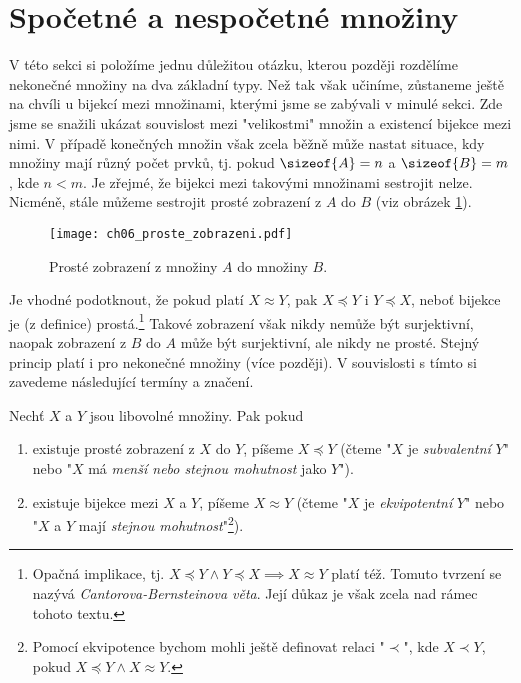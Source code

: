 \section{Spočetné a nespočetné množiny}\label{sec:spocetne_a_nespocetne_mnoziny}
V této sekci si položíme jednu důležitou otázku, kterou později rozdělíme nekonečné množiny na dva základní typy. Než tak však učiníme, zůstaneme ještě na chvíli u bijekcí mezi množinami, kterými jsme se zabývali v minulé sekci. Zde jsme se snažili ukázat souvislost mezi "velikostmi" množin a existencí bijekce mezi nimi. V případě konečných množin však zcela běžně může nastat situace, kdy množiny mají různý počet prvků, tj. pokud $\sizeof{A}=n$ a $\sizeof{B}=m$, kde $n<m$. Je zřejmé, že bijekci mezi takovými množinami sestrojit nelze. Nicméně, stále můžeme sestrojit prosté zobrazení z $A$ do $B$ (viz obrázek \ref{fig:proste_zobrazeni_A_do_B}).
\begin{figure}[H]
    \centering
    \texttt{[image: ch06\_proste\_zobrazeni.pdf]}
    \caption{Prosté zobrazení z množiny $A$ do množiny $B$.}
    \label{fig:proste_zobrazeni_A_do_B}
\end{figure}
Je vhodné podotknout, že pokud platí $X\approx Y$, pak $X\preccurlyeq Y$ i $Y\preccurlyeq X$, neboť bijekce je (z definice) prostá.\footnote{Opačná implikace, tj. $X\preccurlyeq Y \land Y\preccurlyeq X\implies X\approx Y$ platí též. Tomuto tvrzení se nazývá \emph{Cantorova-Bernsteinova věta}. Její důkaz je však zcela nad rámec tohoto textu.}
Takové zobrazení však nikdy nemůže být surjektivní, naopak zobrazení z $B$ do $A$ může být surjektivní, ale nikdy ne prosté. Stejný princip platí i pro nekonečné množiny (více později). V souvislosti s tímto si zavedeme následující termíny a značení.
\begin{definition}\label{def:subvalence_a_ekvipotence}
    Nechť $X$ a $Y$ jsou libovolné množiny. Pak pokud
    \begin{enumerate}[label=(\roman*)]
        \item existuje prosté zobrazení z $X$ do $Y$, píšeme $X\preccurlyeq Y$ (čteme "$X$ je \emph{subvalentní} $Y$" nebo "$X$ má \emph{menší nebo stejnou mohutnost} jako $Y$").
        \item existuje bijekce mezi $X$ a $Y$, píšeme $X\approx Y$ (čteme "$X$ je \emph{ekvipotentní} $Y$" nebo "$X$ a $Y$ mají \emph{stejnou mohutnost}"\footnote{Pomocí ekvipotence bychom mohli ještě definovat relaci "$\prec$", kde $X\prec Y$, pokud $X\preccurlyeq Y \land X\approx Y$.}).
    \end{enumerate}
\end{definition}
